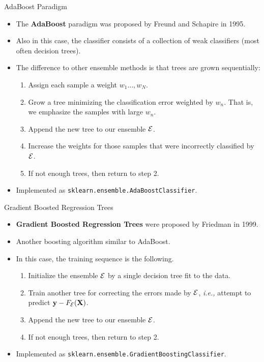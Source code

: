 \documentclass[10pt, aspectratio=169]{beamer} %
\newcommand{\X}{{\bf X}}
\newcommand{\y}{{\bf y}}
\begin{document}
\begin{frame}{AdaBoost Paradigm}
\begin{itemize}
	\item The \textbf{AdaBoost} paradigm
	was proposed 
	by Freund and Schapire in 1995. 
	\item Also in this case, the classifier consists of a collection of
	weak classifiers (most often decision trees). 
	\item The difference to other ensemble methods is that 
	trees are grown sequentially:
	\begin{enumerate}
		\item Assign each sample a weight $w_1\ldots,w_N$.
		\item Grow a tree minimizing the classification error 	
		weighted by $w_n$. That is, we emphasize the samples
		with large $w_n$.
		\item Append the new tree to our ensemble ${\cal E}$.
		\item Increase the weights for those samples that were incorrectly classified by ${\cal E}$.
		\item If not enough trees, then return to step 2.
	\end{enumerate}
	 \item Implemented as \texttt{sklearn.ensemble.AdaBoostClassifier}.
	\end{itemize}
	\end{frame}

		
\begin{frame}{Gradient Boosted Regression Trees}
\begin{itemize}
	\item \textbf{Gradient Boosted Regression Trees}
	were proposed by Friedman in 1999.
	\item Another boosting algorithm similar to AdaBoost.
	\item In this case, the training sequence is the following.
	\begin{enumerate}
		\item Initialize the ensemble ${\cal E}$ by a single decision tree fit to the data.
		\item Train another tree for correcting the errors made by ${\cal E}$, \emph{i.e.,} attempt to predict
		$\y - F_{\cal E}(\X)$.
		\item Append the new tree to our ensemble ${\cal E}$.
		\item If not enough trees, then return to step 2.
	\end{enumerate}
	\item Implemented as \texttt{sklearn.ensemble.GradientBoostingClassifier}.
	
\end{itemize}
	\end{frame}
		
\end{document}
